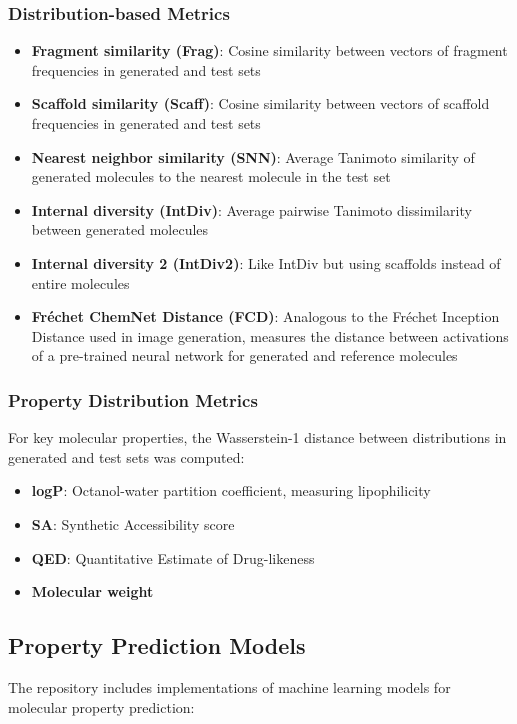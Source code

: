 \documentclass[conference]{IEEEtran}
\begin{document}
\subsubsection{Distribution-based Metrics}
\begin{itemize}
    \item \textbf{Fragment similarity (Frag)}: Cosine similarity between vectors of fragment frequencies in generated and test sets
    \item \textbf{Scaffold similarity (Scaff)}: Cosine similarity between vectors of scaffold frequencies in generated and test sets
    \item \textbf{Nearest neighbor similarity (SNN)}: Average Tanimoto similarity of generated molecules to the nearest molecule in the test set
    \item \textbf{Internal diversity (IntDiv)}: Average pairwise Tanimoto dissimilarity between generated molecules
    \item \textbf{Internal diversity 2 (IntDiv2)}: Like IntDiv but using scaffolds instead of entire molecules
    \item \textbf{Fréchet ChemNet Distance (FCD)}: Analogous to the Fréchet Inception Distance used in image generation, measures the distance between activations of a pre-trained neural network for generated and reference molecules \cite{Preuer2018}
\end{itemize}

\subsubsection{Property Distribution Metrics}
For key molecular properties, the Wasserstein-1 distance between distributions in generated and test sets was computed:
\begin{itemize}
    \item \textbf{logP}: Octanol-water partition coefficient, measuring lipophilicity \cite{Wildman1999}
    \item \textbf{SA}: Synthetic Accessibility score \cite{Ertl2009}
    \item \textbf{QED}: Quantitative Estimate of Drug-likeness \cite{Bickerton2012}
    \item \textbf{Molecular weight}
\end{itemize}

\subsection{Property Prediction Models}
The repository includes implementations of machine learning models for molecular property prediction:
\end{document}
